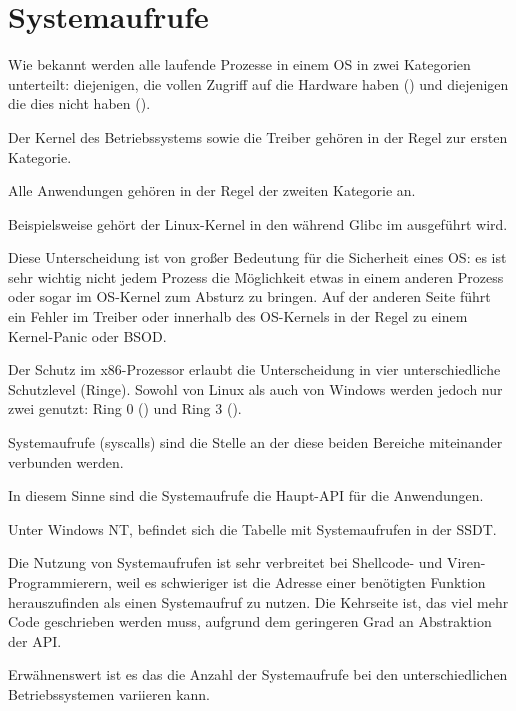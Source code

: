 \section{Systemaufrufe}

\label{syscalls}

Wie bekannt werden alle laufende Prozesse in einem \ac{OS} in zwei Kategorien unterteilt:
diejenigen, die vollen Zugriff auf die Hardware haben () und diejenigen
die dies nicht haben ().

Der Kernel des Betriebssystems sowie die Treiber gehören in der Regel zur ersten Kategorie.

Alle Anwendungen gehören in der Regel der zweiten Kategorie an.

Beispielsweise gehört der Linux-Kernel in den  während Glibc im 
ausgeführt wird.

Diese Unterscheidung ist von großer Bedeutung für die Sicherheit eines \ac{OS}:
es ist sehr wichtig nicht jedem Prozess die Möglichkeit etwas in einem anderen Prozess oder
sogar im \ac{OS}-Kernel zum Absturz zu bringen.
Auf der anderen Seite führt ein Fehler im Treiber oder innerhalb des \ac{OS}-Kernels in der Regel
zu einem Kernel-Panic oder \ac{BSOD}.

Der Schutz im x86-Prozessor erlaubt die Unterscheidung in vier unterschiedliche Schutzlevel (Ringe).
Sowohl von Linux als auch von Windows werden jedoch nur zwei genutzt:
Ring 0 () und Ring 3 ().

Systemaufrufe (syscalls) sind die Stelle an der diese beiden Bereiche miteinander verbunden werden.

In diesem Sinne sind die Systemaufrufe die Haupt-\ac{API} für die Anwendungen.

Unter \gls{Windows NT}, befindet sich die Tabelle mit Systemaufrufen in der \ac{SSDT}.


Die Nutzung von Systemaufrufen ist sehr verbreitet bei Shellcode- und Viren-Programmierern,
weil es schwieriger ist die Adresse einer benötigten Funktion herauszufinden als einen
Systemaufruf zu nutzen.
Die Kehrseite ist, das viel mehr Code geschrieben werden muss, aufgrund dem geringeren Grad
an Abstraktion der \ac{API}.

Erwähnenswert ist es das die Anzahl der Systemaufrufe bei den unterschiedlichen Betriebssystemen
variieren kann.

